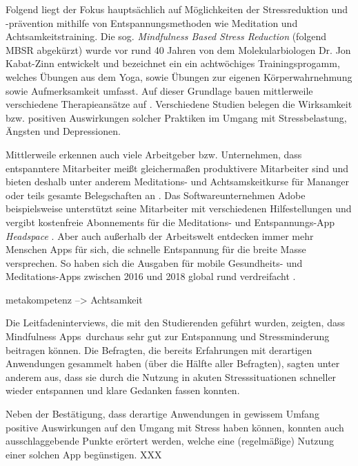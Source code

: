 Folgend liegt der Fokus hauptsächlich auf Möglichkeiten der Stressreduktion und -prävention mithilfe von Entspannungsmethoden wie Meditation und Achtsamkeitstraining.
Die sog. \textit{Mindfulness Based Stress Reduction} (folgend MBSR abgekürzt) wurde vor rund 40 Jahren von dem Molekularbiologen Dr. Jon Kabat-Zinn entwickelt und bezeichnet ein ein achtwöchiges Trainingsprogamm, welches Übungen aus dem Yoga, sowie Übungen zur eigenen Körperwahrnehmung sowie Aufmerksamkeit umfasst. Auf dieser Grundlage bauen mittlerweile verschiedene Therapieansätze auf . Verschiedene Studien belegen die Wirksamkeit bzw. positiven Auswirkungen solcher Praktiken im Umgang mit Stressbelastung, Ängsten und Depressionen.




Mittlerweile erkennen auch viele Arbeitgeber bzw. Unternehmen, dass entspanntere Mitarbeiter meißt gleichermaßen produktivere Mitarbeiter sind und bieten deshalb unter anderem Meditations- und Achtsamskeitkurse für Mananger oder teils gesamte Belegschaften an . Das Softwareunternehmen Adobe beispielsweise unterstützt seine Mitarbeiter mit verschiedenen Hilfestellungen und vergibt kostenfreie Abonnements für die Meditations- und Entspannungs-App \textit{Headspace} . 
Aber auch außerhalb der Arbeitswelt entdecken immer mehr Menschen Apps für sich, die schnelle Entspannung für die breite Masse versprechen. So haben sich die Ausgaben für mobile Gesundheits- und Meditations-Apps zwischen 2016 und 2018 global rund verdreifacht .

metakompetenz --> Achtsamkeit



 Die Leitfadeninterviews, die mit den Studierenden geführt wurden, zeigten, dass \grqq Mindfulness Apps\grqq\ durchaus sehr gut zur Entspannung und Stressminderung beitragen können. Die Befragten, die bereits Erfahrungen mit derartigen Anwendungen gesammelt haben (über die Hälfte aller Befragten), sagten unter anderem aus, dass sie durch die Nutzung in akuten Stresssituationen schneller wieder entspannen und klare Gedanken fassen konnten.
 
 Neben der Bestätigung, dass derartige Anwendungen in gewissem Umfang positive Auswirkungen auf den Umgang mit Stress haben können, konnten auch ausschlaggebende Punkte erörtert werden, welche eine (regelmäßige) Nutzung einer solchen App begünstigen.  XXX